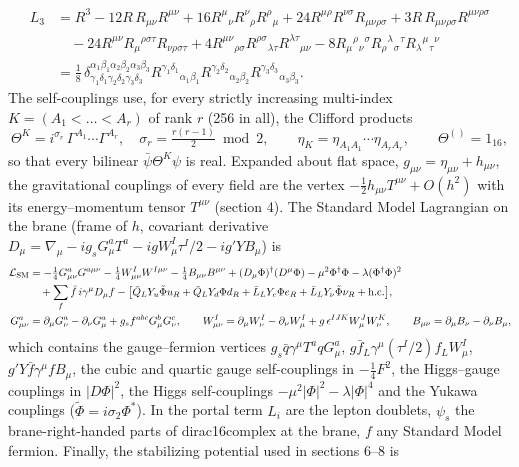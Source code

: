 \documentclass[10pt,a4paper]{article}
\begin{document}
\begin{align*}
L_3&=R^3-12R\,R_{\mu\nu}R^{\mu\nu}+16R^\mu{}_\nu R^\nu{}_\rho R^\rho{}_\mu+24R^{\mu\rho}R^{\nu\sigma}R_{\mu\nu\rho\sigma}+3R\,R_{\mu\nu\rho\sigma}R^{\mu\nu\rho\sigma} \\
&\quad-24R^{\mu\nu}R_\mu{}^{\rho\sigma\tau}R_{\nu\rho\sigma\tau}+4R^{\mu\nu}{}_{\rho\sigma}R^{\rho\sigma}{}_{\lambda\tau}R^{\lambda\tau}{}_{\mu\nu}-8R_\mu{}^\rho{}_\nu{}^\sigma R_\rho{}^\lambda{}_\sigma{}^\tau R_\lambda{}^\mu{}_\tau{}^\nu \\
&=\frac18\,\delta^{\alpha_1\beta_1\alpha_2\beta_2\alpha_3\beta_3}_{\gamma_1\delta_1\gamma_2\delta_2\gamma_3\delta_3}R^{\gamma_1\delta_1}{}_{\alpha_1\beta_1}R^{\gamma_2\delta_2}{}_{\alpha_2\beta_2}R^{\gamma_3\delta_3}{}_{\alpha_3\beta_3}.
\end{align*}
The self-couplings use, for every strictly increasing multi-index $K=(A_1<\dots<A_r)$ of rank $r$ (256 in all), the Clifford products
\begin{equation*}
\Theta^K=i^{\sigma_r}\,\Gamma^{A_1}\cdots\Gamma^{A_r},\quad \sigma_r=\tfrac{r(r-1)}2\bmod2,\qquad \eta_K=\eta_{A_1A_1}\cdots\eta_{A_rA_r},\qquad \Theta^{()}=1_{16},
\end{equation*}
so that every bilinear $\bar\psi\Theta^K\psi$ is real. Expanded about flat space, $g_{\mu\nu}=\eta_{\mu\nu}+h_{\mu\nu}$, the gravitational couplings of every field are the vertex $-\tfrac12h_{\mu\nu}T^{\mu\nu}+O(h^2)$ with its energy–momentum tensor $T^{\mu\nu}$ (section 4). The Standard Model Lagrangian on the brane (frame of $h$, covariant derivative $D_\mu=\nabla_\mu-ig_sG^a_\mu T^a-igW^I_\mu\tau^I/2-ig'YB_\mu$) is
\begin{align*}
\mathcal L_{\rm SM}&=-\tfrac14G^a_{\mu\nu}G^{a\mu\nu}-\tfrac14W^I_{\mu\nu}W^{I\mu\nu}-\tfrac14B_{\mu\nu}B^{\mu\nu}+(D_\mu\Phi)^\dagger(D^\mu\Phi)-\mu^2\Phi^\dagger\Phi-\lambda(\Phi^\dagger\Phi)^2 \\
&\quad+\sum_f\bar f\,i\gamma^\mu D_\mu f-\big[\bar Q_LY_u\tilde\Phi u_R+\bar Q_LY_d\Phi d_R+\bar L_LY_e\Phi e_R+\bar L_LY_\nu\tilde\Phi\nu_R+\text{h.c.}\big], \\
G^a_{\mu\nu}&=\partial_\mu G^a_\nu-\partial_\nu G^a_\mu+g_sf^{abc}G^b_\mu G^c_\nu,\qquad W^I_{\mu\nu}=\partial_\mu W^I_\nu-\partial_\nu W^I_\mu+g\,\epsilon^{IJK}W^J_\mu W^K_\nu,\qquad B_{\mu\nu}=\partial_\mu B_\nu-\partial_\nu B_\mu,
\end{align*}
which contains the gauge–fermion vertices $g_s\bar q\gamma^\mu T^aqG^a_\mu$, $g\bar f_L\gamma^\mu(\tau^I/2)f_LW^I_\mu$, $g'Y\bar f\gamma^\mu fB_\mu$, the cubic and quartic gauge self-couplings in $-\tfrac14F^2$, the Higgs–gauge couplings in $|D\Phi|^2$, the Higgs self-couplings $-\mu^2|\Phi|^2-\lambda|\Phi|^4$ and the Yukawa couplings ($\tilde\Phi=i\sigma_2\Phi^*$). In the portal term $L_i$ are the lepton doublets, $\psi_s$ the brane-right-handed parts of dirac16complex at the brane, $f$ any Standard Model fermion. Finally, the stabilizing potential used in sections 6–8 is
\end{document}
